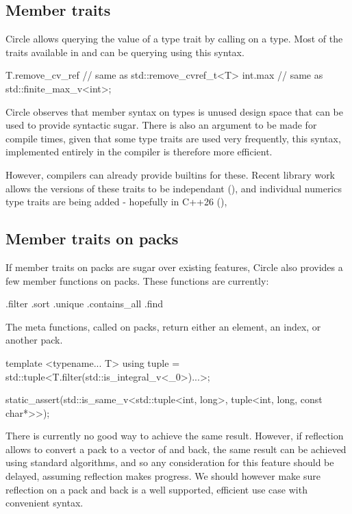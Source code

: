 \documentclass{wg21}
\begin{document}
\subsection{Member traits}

Circle allows querying the value of a type trait by calling \emph{} on a type.
Most of the traits available in  and  can be querying using this syntax.

\begin{colorblock}
T.remove_cv_ref  // same as std::remove_cvref_t<T>
int.max          // same as std::finite_max_v<int>;
\end{colorblock}

Circle observes that member syntax on types is unused design space that can be used to provide syntactic sugar.
There is also an argument to be made for compile times, given that some type traits are used very frequently,
this syntax, implemented entirely in the compiler is therefore more efficient.

However, compilers can already provide builtins for these.
Recent library work allows the  versions of these traits to be independant (),
and individual numerics type traits are being added - hopefully in C++26 (),

\subsection{Member traits on packs}

If member traits on packs are sugar over existing features, Circle also provides a few member functions on packs.
These functions are currently:
\begin{codeblock}
.filter
.sort
.unique
.contains_all
.find
\end{codeblock}

The meta functions, called on packs, return either an element, an index, or another pack.

\begin{colorblock}
template <typename... T>
using tuple = std::tuple<T.filter(std::is_integral_v<_0>)...>;

static_assert(std::is_same_v<std::tuple<int, long>,
                             tuple<int, long, const char*>>);
\end{colorblock}

There is currently no good way to achieve the same result.
However, if reflection allows to convert a pack to a vector of  and back, the same result can be achieved using standard algorithms, and so any consideration for this feature should be delayed, assuming reflection makes progress.
We should however make sure reflection on a pack and back is a well supported, efficient use case with convenient syntax.
\end{document}
